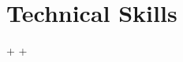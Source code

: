 \documentclass[letterpaper,10pt]{article}                                                                                                                                                                                                                                                                                                                                                                                                                                                                                                                                                                         +
\begin{document}
 \section{Technical Skills}                                                                                                                                                                                                                                                                                                                                                                                                                                                                                                                                                                                        +
                                                                                                                                                                                                                                                                                                                                                                                                                                                                                                                                                                                                                   +
\end{document}
